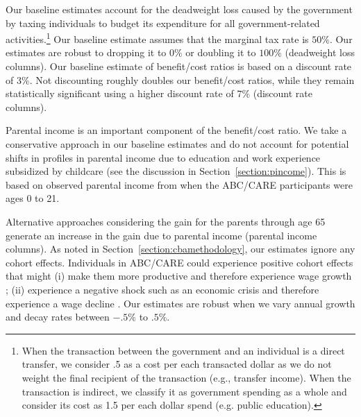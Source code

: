Our baseline estimates account for the deadweight loss caused by the government by taxing individuals to budget its expenditure for all government-related activities.\footnote{When the transaction between the government and an individual is a direct transfer, we consider .5 as a cost per each transacted dollar as we do not weight the final recipient of the transaction (e.g., transfer income). When the transaction is indirect, we classify it as government spending as a whole and consider its cost as 1.5 per each dollar spend (e.g. public education).} Our baseline estimate assumes that the marginal tax rate is $50\%$. Our estimates are robust to dropping it to $0\%$ or doubling it to $100\%$ (deadweight loss columns). Our baseline estimate of benefit/cost ratios is based on a discount rate of $3\%$. Not discounting roughly doubles our benefit/cost ratios, while they remain statistically significant using a higher discount rate of $7\%$ (discount rate columns).

Parental income is an important component of the benefit/cost ratio. We take a conservative approach in our baseline estimates and do not account for potential shifts in profiles in parental income due to education and work experience subsidized by childcare (see the discussion in Section~\ref{section:pincome}). This is based on observed parental income from when the ABC/CARE participants were ages 0 to 21.

Alternative approaches considering the gain for the parents through age 65 generate an increase in the gain due to parental income (parental income columns). As noted in Section~\ref{section:cbamethodology}, our estimates ignore any cohort effects. Individuals in ABC/CARE could experience positive cohort effects that might (i) make them more productive and therefore experience wage growth \citep{Lagakos_Moll_etal_2016_LifeCycle_NBER}; (ii) experience a negative shock such as an economic crisis and therefore experience a wage decline \citep{Jarosch_2016_JobSecurity_Econometrica}. Our estimates are robust when we vary annual growth and decay rates between $-.5\%$ to $.5\%$.

